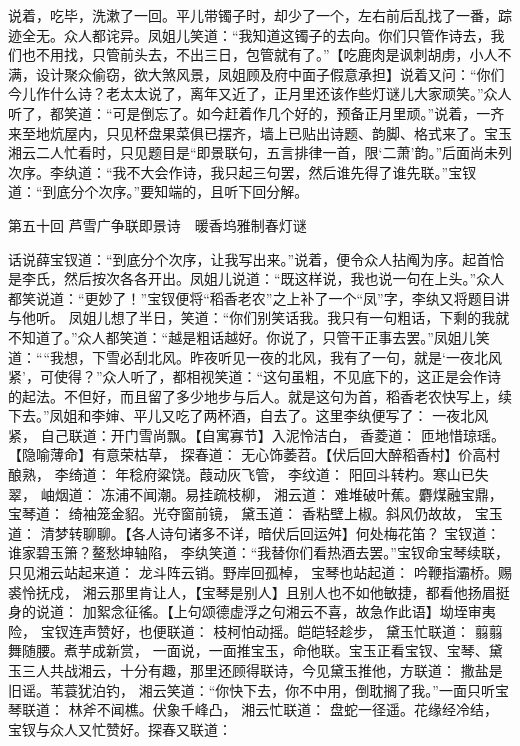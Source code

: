 \documentclass[12pt,oneside]{book}
\begin{document}
说着，吃毕，洗漱了一回。平儿带镯子时，却少了一个，左右前后乱找了一番，踪迹全无。众人都诧异。凤姐儿笑道：“我知道这镯子的去向。你们只管作诗去，我们也不用找，只管前头去，不出三日，包管就有了。”【吃鹿肉是讽刺胡虏，小人不满，设计聚众偷窃，欲大煞风景，凤姐顾及府中面子假意承担】说着又问：“你们今儿作什么诗？老太太说了，离年又近了，正月里还该作些灯谜儿大家顽笑。”众人听了，都笑道：“可是倒忘了。如今赶着作几个好的，预备正月里顽。”说着，一齐来至地炕屋内，只见杯盘果菜俱已摆齐，墙上已贴出诗题、韵脚、格式来了。宝玉湘云二人忙看时，只见题目是“即景联句，五言排律一首，限‘二萧’韵。”后面尚未列次序。李纨道：“我不大会作诗，我只起三句罢，然后谁先得了谁先联。”宝钗道：“到底分个次序。”要知端的，且听下回分解。


 
第五十回  芦雪广争联即景诗　暖香坞雅制春灯谜


话说薛宝钗道：“到底分个次序，让我写出来。”说着，便令众人拈阄为序。起首恰是李氏，然后按次各各开出。凤姐儿说道：“既这样说，我也说一句在上头。”众人都笑说道：“更妙了！”宝钗便将“稻香老农”之上补了一个“凤”字，李纨又将题目讲与他听。
凤姐儿想了半日，笑道：“你们别笑话我。我只有一句粗话，下剩的我就不知道了。”众人都笑道：“越是粗话越好。你说了，只管干正事去罢。”凤姐儿笑道：““我想，下雪必刮北风。昨夜听见一夜的北风，我有了一句，就是‘一夜北风紧’，可使得？”众人听了，都相视笑道：“这句虽粗，不见底下的，这正是会作诗的起法。不但好，而且留了多少地步与后人。就是这句为首，稻香老农快写上，续下去。”凤姐和李婶、平儿又吃了两杯酒，自去了。这里李纨便写了：
一夜北风紧，
自己联道：开门雪尚飘。【自寓寡节】入泥怜洁白，
香菱道：  匝地惜琼瑶。【隐喻薄命】有意荣枯草，
探春道：  无心饰萎苕。【伏后回大醉稻香村】价高村酿熟，
李绮道：  年稔府粱饶。葭动灰飞管，
李纹道：  阳回斗转杓。寒山已失翠，
岫烟道：  冻浦不闻潮。易挂疏枝柳，
湘云道：  难堆破叶蕉。麝煤融宝鼎，
宝琴道：  绮袖笼金貂。光夺窗前镜，
黛玉道：  香粘壁上椒。斜风仍故故，
宝玉道：  清梦转聊聊。【各人诗句诸多不详，暗伏后回运舛】何处梅花笛？
宝钗道：  谁家碧玉箫？鳌愁坤轴陷，
李纨笑道：“我替你们看热酒去罢。”宝钗命宝琴续联，只见湘云站起来道：
龙斗阵云销。野岸回孤棹，
宝琴也站起道：
吟鞭指灞桥。赐裘怜抚戍，
湘云那里肯让人，【宝琴是别人】且别人也不如他敏捷，都看他扬眉挺身的说道：
加絮念征徭。【上句颂德虚浮之句湘云不喜，故急作此语】坳垤审夷险，
宝钗连声赞好，也便联道：
枝柯怕动摇。皑皑轻趁步，
黛玉忙联道：
翦翦舞随腰。煮芋成新赏，
一面说，一面推宝玉，命他联。宝玉正看宝钗、宝琴、黛玉三人共战湘云，十分有趣，那里还顾得联诗，今见黛玉推他，方联道：
撒盐是旧谣。苇蓑犹泊钓，
湘云笑道：“你快下去，你不中用，倒耽搁了我。”一面只听宝琴联道：
林斧不闻樵。伏象千峰凸，
湘云忙联道：
盘蛇一径遥。花缘经冷结，
宝钗与众人又忙赞好。探春又联道：
\end{document}
